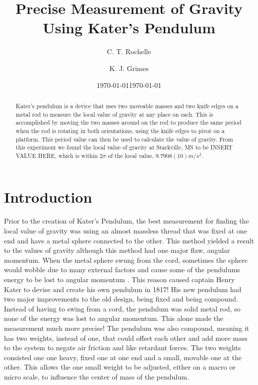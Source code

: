 \documentclass[aps,prl,10pt,twocolumn,floatfix]{revtex4-2}
\begin{document}
\begin{abstract}
Kater's pendulum is a device that uses two moveable masses and two knife edges on a metal rod to measure the local value of gravity at any place on each. 
This is accomplished by moving the two masses around on the rod to produce the same period when the rod is rotating in both orientations, using the knife edges to pivot on a platform. 
This period value can then be used to calculate the value of gravity.
From this experiment we found the local value of gravity at Starkville, MS to be INSERT VALUE HERE, which is within $2\sigma$ of the local value, $9.7908(10)m/s^2$.
\end{abstract}


\title{Precise Measurement of Gravity Using Kater's Pendulum}
\author{C. T. Rochelle}
\author{K. J. Grimes}
\date{\today}
\date{\today}

\maketitle

\section{Introduction}\label{Intro}
Prior to the creation of Kater's Pendulum, the best measurement for finding the local value of gravity was using an almost massless thread that was fixed at one end and have a metal sphere connected to the other. 
This method yielded a result to the values of gravity although this method had one major flaw, angular momentum.
When the metal sphere swung from the cord, sometimes the sphere would wobble due to many external factors and cause some of the pendulums energy to be lost to angular momentum \cite{BeforeKater}. 
This reason caused captain Henry Kater to devise and create his own pendulum in 1817\cite{KatersWork}!
His new pendulum had two major improvements to the old design, being fixed and being compound. 
Instead of having to swing from a cord, the pendulum was solid metal rod, so none of the energy was lost to angular momentum. 
This alone made the measurement much more precise!
The pendulum was also compound, meaning it has two weights, instead of one, that could offset each other and add more mass to the system to negate air friction and like retardant forces. 
The two weights consisted one one heavy, fixed one at one end and a small, movable one at the other. 
This allows the one small weight to be adjusted, either on a macro or micro scale, to influence the center of mass of the pendulum.  
\end{document}
